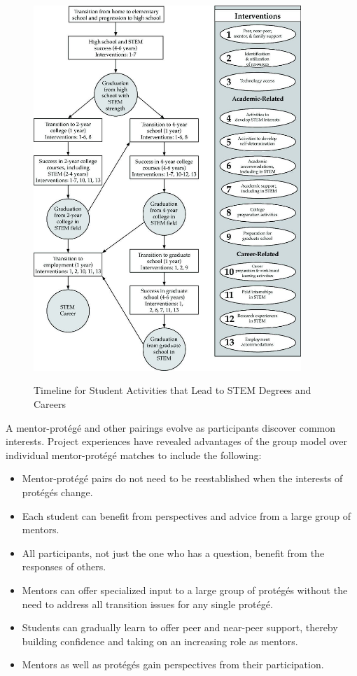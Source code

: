 \documentclass[11.5pt]{sig-alternate} %
\begin{document}
\begin{large}
\begin{figure}[]
    \centering
    \includegraphics[width=0.9\textwidth]{figure 1.jpg}
    \label{Figure 1}
    \caption{Timeline for Student Activities that Lead to STEM Degrees and Careers}
\end{figure}

A mentor-protégé and other pairings evolve as participants discover common interests. Project experiences have revealed advantages of the group model over individual mentor-protégé matches to include the following:
\begin{itemize}
    \item Mentor-protégé pairs do not need to be reestablished when the interests of protégés change.
    \item Each student can benefit from perspectives and advice from a large group of mentors.
    \item All participants, not just the one who has a question, benefit from the responses of others.
    \item Mentors can offer specialized input to a large group of protégés without the need to address all transition issues for any single protégé.
    \item Students can gradually learn to offer peer and near-peer support, thereby building confidence and taking on an increasing role as mentors.
    \item Mentors as well as protégés gain perspectives from their participation.
\end{itemize}


\end{large}
\end{document}
